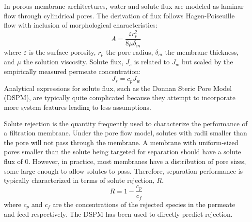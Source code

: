   In porous membrane architectures, water and solute flux are modeled as laminar flow
  through cylindrical pores. The derivation of flux follows Hagen-Poiseuille flow with 
  inclusion of morphological characteristics:~\cite{baker_membrane_2012}
  \begin{equation}
    A = \frac{\varepsilon r_p^2}{8\mu\delta_m}
  \end{equation}
  where $\varepsilon$ is the surface porosity, $r_p$ the pore radius, $\delta_m$ the
  membrane thickness, and $\mu$ the solution viscosity. Solute flux, $J_s$ is related
  to $J_w$ but scaled by the empirically measured permeate concentration:
  \begin{equation}
    J_s = c_p J_w
  \end{equation}
  Analytical expressions for solute flux, such as the Donnan Steric Pore Model (DSPM), 
  are typically quite complicated because they attempt to incorporate more system features
  leading to less assumptions.~\cite{bowen_modelling_2002}
  
  Solute rejection is the quantity frequently used to characterize the performance of a 
  filtration membrane. Under the pore flow model, solutes with radii smaller than the 
  pore will not pass through the membrane. A membrane with uniform-sized pores smaller
  than the solute being targeted for separation should have a solute flux of 0. However,
  in practice, most membranes have a distribution of pore sizes, some large enough to
  allow solutes to pass. Therefore, separation performance is typically characterized
  in terms of solute rejection, $R$. 
  \begin{equation}
     R = 1 - \frac{c_p}{c_f}
  \end{equation}
  where $c_p$ and $c_f$ are the concentrations of the rejected species in the permeate
  and feed respectively. The DSPM has been used to directly predict 
  rejection.~\cite{hatakeyama_water_2011,bowen_modelling_2002}
  
